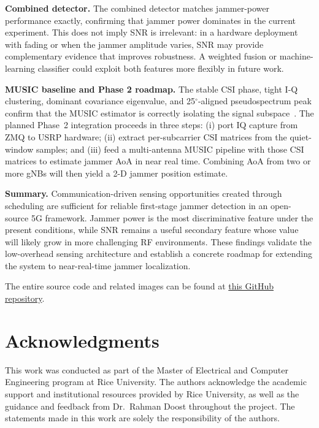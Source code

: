 \documentclass[conference]{IEEEtran}
\begin{document}
\textbf{Combined detector.}
The combined detector matches jammer-power performance exactly,
confirming that jammer power dominates in the current experiment. This
does not imply SNR is irrelevant: in a hardware deployment with fading or
when the jammer amplitude varies, SNR may provide complementary evidence
that improves robustness. A weighted fusion or machine-learning classifier
could exploit both features more flexibly in future work.

\textbf{MUSIC baseline and Phase 2 roadmap.}
The stable CSI phase, tight I-Q clustering, dominant covariance
eigenvalue, and 25$^\circ$-aligned pseudospectrum peak confirm that the
MUSIC estimator is correctly isolating the signal subspace~\cite{1143830}.
The planned Phase~2 integration proceeds in three steps: (i) port IQ
capture from ZMQ to USRP hardware; (ii) extract per-subcarrier CSI
matrices from the quiet-window samples; and (iii) feed a multi-antenna
MUSIC pipeline with those CSI matrices to estimate jammer AoA in near
real time. Combining AoA from two or more gNBs will then yield a
2-D jammer position estimate.

\textbf{Summary.}
Communication-driven sensing opportunities created through scheduling are
sufficient for reliable first-stage jammer detection in an open-source 5G
framework. Jammer power is the most discriminative feature under the
present conditions, while SNR remains a useful secondary feature whose
value will likely grow in more challenging RF environments. These findings
validate the low-overhead sensing architecture and establish a concrete
roadmap for extending the system to near-real-time jammer localization.

The entire source code and related images can be found at \href{https://github.com/AniketttJadhav/srsRAN-Open5GS}{this GitHub repository}.

\section*{Acknowledgments}

This work was conducted as part of the Master of Electrical and Computer
Engineering program at Rice University. The authors acknowledge the
academic support and institutional resources provided by Rice University,
as well as the guidance and feedback from Dr.\ Rahman Doost throughout
the project. The statements made in this work are solely the
responsibility of the authors.
\end{document}
